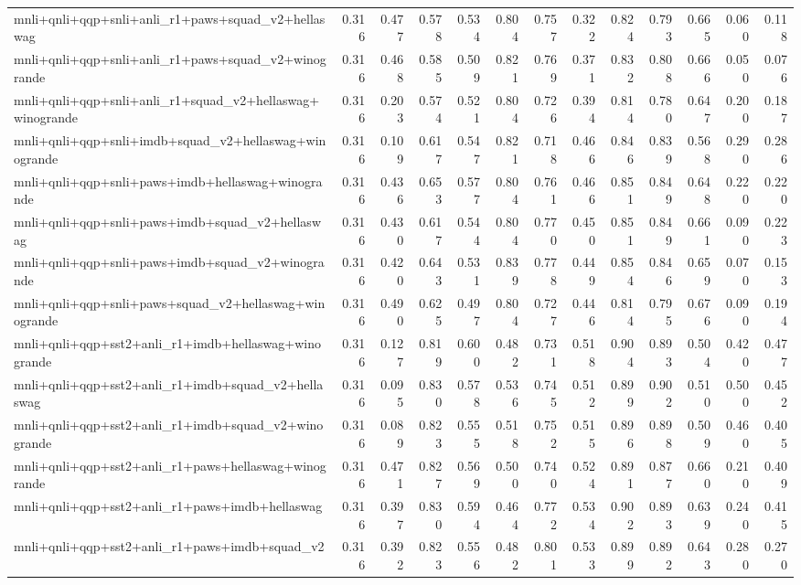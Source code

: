 \begin{table}[t]
\begin{tabular}{lrrrrrrrrrrrr}
    mnli+qnli+qqp+snli+anli\_r1+paws+squad\_v2+hellaswag & 0.316 & 0.477 & 0.578 & 0.534 & 0.804 & 0.757 & 0.322 & 0.824 & 0.793 & 0.665 & 0.060 & 0.118 \\
    mnli+qnli+qqp+snli+anli\_r1+paws+squad\_v2+winogrande & 0.316 & 0.468 & 0.585 & 0.509 & 0.821 & 0.769 & 0.371 & 0.832 & 0.808 & 0.666 & 0.050 & 0.076 \\
    mnli+qnli+qqp+snli+anli\_r1+squad\_v2+hellaswag+winogrande & 0.316 & 0.203 & 0.574 & 0.521 & 0.804 & 0.726 & 0.394 & 0.814 & 0.780 & 0.647 & 0.200 & 0.187 \\
    mnli+qnli+qqp+snli+imdb+squad\_v2+hellaswag+winogrande & 0.316 & 0.109 & 0.617 & 0.547 & 0.821 & 0.718 & 0.466 & 0.846 & 0.839 & 0.568 & 0.290 & 0.286 \\
    mnli+qnli+qqp+snli+paws+imdb+hellaswag+winogrande & 0.316 & 0.436 & 0.653 & 0.577 & 0.804 & 0.761 & 0.466 & 0.851 & 0.849 & 0.648 & 0.220 & 0.220 \\
    mnli+qnli+qqp+snli+paws+imdb+squad\_v2+hellaswag & 0.316 & 0.430 & 0.617 & 0.544 & 0.804 & 0.770 & 0.450 & 0.851 & 0.849 & 0.661 & 0.090 & 0.223 \\
    mnli+qnli+qqp+snli+paws+imdb+squad\_v2+winogrande & 0.316 & 0.420 & 0.643 & 0.531 & 0.839 & 0.778 & 0.449 & 0.854 & 0.846 & 0.659 & 0.070 & 0.153 \\
    mnli+qnli+qqp+snli+paws+squad\_v2+hellaswag+winogrande & 0.316 & 0.490 & 0.625 & 0.497 & 0.804 & 0.727 & 0.446 & 0.814 & 0.795 & 0.676 & 0.090 & 0.194 \\
    mnli+qnli+qqp+sst2+anli\_r1+imdb+hellaswag+winogrande & 0.316 & 0.127 & 0.819 & 0.600 & 0.482 & 0.731 & 0.518 & 0.904 & 0.893 & 0.504 & 0.420 & 0.477 \\
    mnli+qnli+qqp+sst2+anli\_r1+imdb+squad\_v2+hellaswag & 0.316 & 0.095 & 0.830 & 0.578 & 0.536 & 0.745 & 0.512 & 0.899 & 0.902 & 0.510 & 0.500 & 0.452 \\
    mnli+qnli+qqp+sst2+anli\_r1+imdb+squad\_v2+winogrande & 0.316 & 0.089 & 0.823 & 0.555 & 0.518 & 0.752 & 0.515 & 0.896 & 0.898 & 0.509 & 0.460 & 0.405 \\
    mnli+qnli+qqp+sst2+anli\_r1+paws+hellaswag+winogrande & 0.316 & 0.471 & 0.827 & 0.569 & 0.500 & 0.740 & 0.524 & 0.891 & 0.877 & 0.660 & 0.210 & 0.409 \\
    mnli+qnli+qqp+sst2+anli\_r1+paws+imdb+hellaswag & 0.316 & 0.397 & 0.830 & 0.594 & 0.464 & 0.772 & 0.534 & 0.902 & 0.893 & 0.639 & 0.240 & 0.415 \\
    mnli+qnli+qqp+sst2+anli\_r1+paws+imdb+squad\_v2 & 0.316 & 0.392 & 0.823 & 0.556 & 0.482 & 0.801 & 0.533 & 0.899 & 0.892 & 0.643 & 0.280 & 0.270 \\

\end{tabular}
\end{table}
